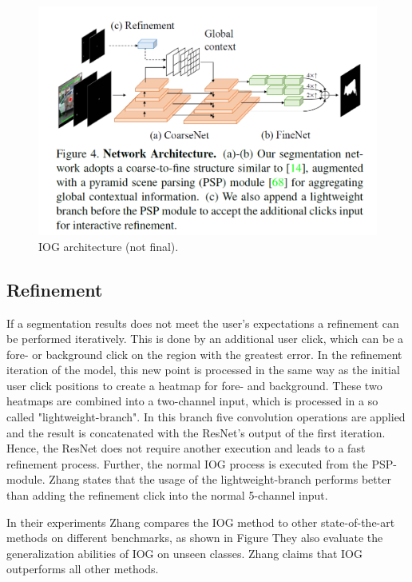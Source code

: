 \begin{figure}
	\includegraphics[width=\linewidth]{figures/chap31_arch.png}
	\caption{IOG architecture (not final).}
	\label{fig:ch3:sec1:arch}
\end{figure}

\subsection{Refinement}\label{ord:ch3:sec1:subsec3}
If a segmentation results does not meet the user's expectations a refinement can be performed iteratively. 
This is done by an additional user click, which can be a fore- or background click on the region with the greatest error. 
In the refinement iteration of the model, this new point is processed in the same way as the initial user click positions to create a heatmap for fore- and background.
These two heatmaps are combined into a two-channel input, which is processed in a so called "lightweight-branch". 
In this branch five convolution operations are applied and the result is concatenated with the ResNet's output of the first iteration.
Hence, the ResNet does not require another execution and leads to a fast refinement process.
Further, the normal IOG process is executed from the PSP-module. 
Zhang states that the usage of the lightweight-branch performs better than adding the refinement click into the normal 5-channel input.

In their experiments Zhang compares the IOG method to other state-of-the-art methods on different benchmarks, as shown in Figure %
They also evaluate the generalization abilities of IOG on unseen classes.
Zhang claims that IOG outperforms all other methods.

